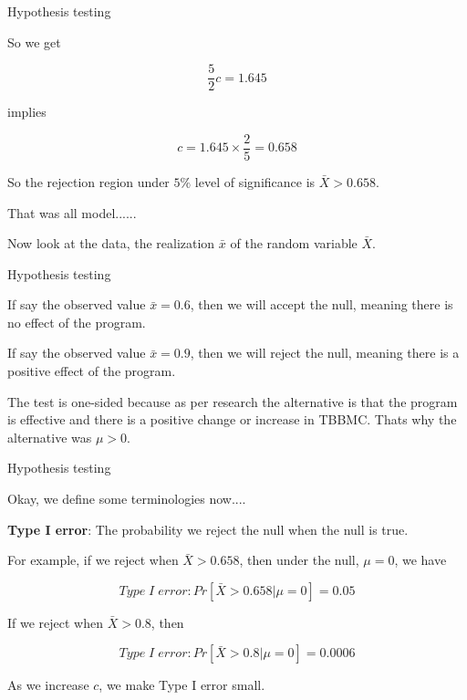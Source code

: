 \documentclass{beamer}\usepackage[]{graphicx}\usepackage[]{color}
\begin{document}
\begin{frame}{Hypothesis testing}

So we get 

$$ \frac{5}{2} c = 1.645 $$ \pause

implies 

$$ c = 1.645 \times \frac{2}{5} = 0.658 $$ \pause

So the rejection region under $5\%$ level of significance is $\bar{X} > 0.658$. \pause

That was all model......\pause

Now look at the data, the realization $\bar{x}$ of the random variable $\bar{X}$. \pause

\end{frame}

\begin{frame}{Hypothesis testing}

If say the observed value $\bar{x}=0.6$, then we will accept the null, meaning there is no effect of the program. \pause  \newline

If say the observed value $\bar{x}=0.9$, then we will reject the null, meaning there is a positive effect of the program. \pause \newline

The test is one-sided because as per research the alternative is that the program is effective and there is a positive change or increase in TBBMC. Thats why the alternative was $\mu > 0$. \pause

\end{frame}

\begin{frame}{Hypothesis testing}

Okay, we define some terminologies now.... \pause  \newline

\textbf{Type I error}: The probability we reject the null when the null is true. \pause

For example, if we reject when $\bar{X} > 0.658$, then under the null, $\mu=0$, we have

$$ Type \; I \; error: Pr \left [ \bar{X} > 0.658 | \mu=0 \right ] = 0.05 $$ \pause

If we reject when $\bar{X} > 0.8$, then 

$$ Type \; I \; error: Pr \left [ \bar{X} > 0.8 | \mu=0 \right ] = 0.0006 $$ \pause

As we increase $c$, we make Type I error small.

\end{frame}
\end{document}
